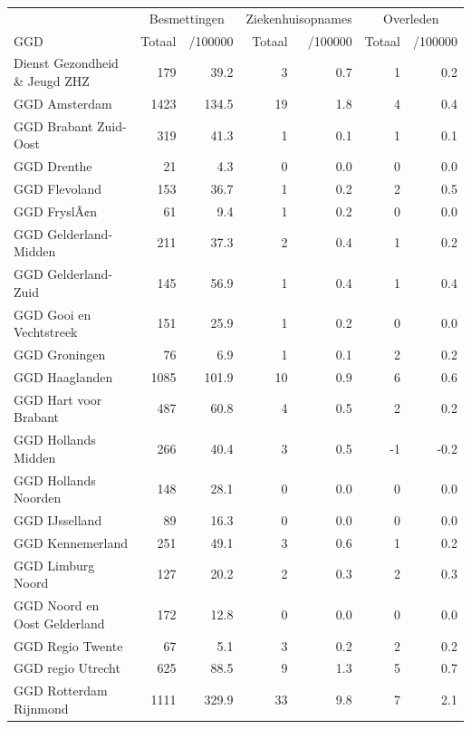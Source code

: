 \documentclass[
  english,
  man,floatsintext]{apa6}
\begin{document}
\begin{table}[H]
\centering\begingroup\fontsize{10}{12}\selectfont

\begin{threeparttable}
\begin{tabular}{lrrrrrr}
\toprule
\multicolumn{1}{c}{ } & \multicolumn{2}{c}{Besmettingen} & \multicolumn{2}{c}{Ziekenhuisopnames} & \multicolumn{2}{c}{Overleden} \\
\cmidrule(l{3pt}r{3pt}){2-3} \cmidrule(l{3pt}r{3pt}){4-5} \cmidrule(l{3pt}r{3pt}){6-7}
GGD & Totaal & /100000 & Totaal & /100000 & Totaal & /100000\\
\midrule
Dienst Gezondheid \& Jeugd ZHZ & 179 & 39.2 & 3 & 0.7 & 1 & 0.2\\
GGD Amsterdam & 1423 & 134.5 & 19 & 1.8 & 4 & 0.4\\
GGD Brabant Zuid-Oost & 319 & 41.3 & 1 & 0.1 & 1 & 0.1\\
GGD Drenthe & 21 & 4.3 & 0 & 0.0 & 0 & 0.0\\
GGD Flevoland & 153 & 36.7 & 1 & 0.2 & 2 & 0.5\\
GGD FryslÃ¢n & 61 & 9.4 & 1 & 0.2 & 0 & 0.0\\
GGD Gelderland-Midden & 211 & 37.3 & 2 & 0.4 & 1 & 0.2\\
GGD Gelderland-Zuid & 145 & 56.9 & 1 & 0.4 & 1 & 0.4\\
GGD Gooi en Vechtstreek & 151 & 25.9 & 1 & 0.2 & 0 & 0.0\\
GGD Groningen & 76 & 6.9 & 1 & 0.1 & 2 & 0.2\\
GGD Haaglanden & 1085 & 101.9 & 10 & 0.9 & 6 & 0.6\\
GGD Hart voor Brabant & 487 & 60.8 & 4 & 0.5 & 2 & 0.2\\
GGD Hollands Midden & 266 & 40.4 & 3 & 0.5 & -1 & -0.2\\
GGD Hollands Noorden & 148 & 28.1 & 0 & 0.0 & 0 & 0.0\\
GGD IJsselland & 89 & 16.3 & 0 & 0.0 & 0 & 0.0\\
GGD Kennemerland & 251 & 49.1 & 3 & 0.6 & 1 & 0.2\\
GGD Limburg Noord & 127 & 20.2 & 2 & 0.3 & 2 & 0.3\\
GGD Noord en Oost Gelderland & 172 & 12.8 & 0 & 0.0 & 0 & 0.0\\
GGD Regio Twente & 67 & 5.1 & 3 & 0.2 & 2 & 0.2\\
GGD regio Utrecht & 625 & 88.5 & 9 & 1.3 & 5 & 0.7\\
GGD Rotterdam Rijnmond & 1111 & 329.9 & 33 & 9.8 & 7 & 2.1\\

\end{tabular}
\end{threeparttable}
\end{table}
\end{document}
